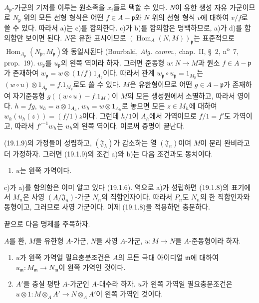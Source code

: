 
$A_{\mathfrak p}$-가군의 기저를 이루는 원소족을 $x_i$들로 택할 수
있다. $N$이 유한 생성 자유 가군이므로 $N_{\mathfrak p}$ 위의 모든
선형 형식은 어떤 $f\in A-\mathfrak p$와 $N$ 위의 선형 형식 $v$에
대하여 $v/f$로 쓸 수 있다. 따라서 a)는 c)를 함의한다. c)가 b)를
함의함은 명백하므로, a)가 d)를 함의함만 보이면 된다. $N$은 유한
표시이므로
$(\operatorname{Hom}_A(N,M))_{\mathfrak p}$는 표준적으로
$\operatorname{Hom}_{A_{\mathfrak p}}
(N_{\mathfrak p},M_{\mathfrak p})$와 동일시된다
(Bourbaki, \emph{Alg. comm.}, chap.~II, §~2,
n\textsuperscript{o}~7, prop.~19). $w_{\mathfrak p}$를
$u_{\mathfrak p}$의 왼쪽 역이라 하자. 그러면 준동형 $w:N\to M$과
원소 $f\in A-\mathfrak p$가 존재하여
$w_{\mathfrak p}=w\otimes(1/f)1_{A_{\mathfrak p}}$이다. 따라서 관계
$w_{\mathfrak p}\circ u_{\mathfrak p}=1_{M_{\mathfrak p}}$는
$(w\circ u)\otimes1_{A_{\mathfrak p}}
=f.1_{M_{\mathfrak p}}$로도 쓸 수 있다. $M$은 유한형이므로 어떤
$g\in A-\mathfrak p$가 존재하여 자기준동형
$g((w\circ u)-f.1_M)$이 $M$의 모든 생성원에서 소멸하고, 따라서
영이다. $h=fg$, $u_h=u\otimes1_{A_h}$,
$w_h=w\otimes1_{A_h}$로 놓으면 모든 $z\in M_h$에 대하여
$w_h(u_h(z))=(f/1)z$이다. 그런데 $h/1$이 $A_h$에서 가역이므로
$f/1=f'$도 가역이고, 따라서 $f'^{-1}w_h$는 $u_h$의 왼쪽 역이다.
이로써 증명이 끝난다.

\begin{proposition}[19.1.13]
\label{0.19.1.13-fr}
(19.1.9)의 가정들이 성립하고, $(\mathfrak J_\lambda)$가 감소하는 열
$(\mathfrak J_n)$이며 $M$이 분리 완비라고 더 가정하자. 그러면
(19.1.9)의 조건 a)와 b)는 다음 조건과도 동치이다.
\begin{enumerate}
  \item[c)] $u$는 왼쪽 가역이다.
\end{enumerate}
\end{proposition}

c)가 a)를 함의함은 이미 알고 있다 (19.1.6). 역으로 a)가 성립하면
(19.1.8)의 표기에서 $M_n$은 사영 $(A/\mathfrak J_n)$-가군
$N_n$의 직합인자이다. 따라서 $P_n$도 $N_n$의 한 직합인자와
동형이고, 그러므로 사영 가군이다. 이제 (19.1.8)을 적용하면
충분하다.

끝으로 다음 명제를 주목하자.

\begin{proposition}[19.1.14]
\label{0.19.1.14-fr}
$A$를 환, $M$을 유한형 $A$-가군, $N$을 사영 $A$-가군,
$u:M\to N$을 $A$-준동형이라 하자.
\begin{enumerate}
  \item[(i)] $u$가 왼쪽 가역일 필요충분조건은 $A$의 모든 극대
  아이디얼 $\mathfrak m$에 대하여
  $u_{\mathfrak m}:M_{\mathfrak m}\to N_{\mathfrak m}$이 왼쪽
  가역인 것이다.
  \item[(ii)] $A'$을 충실 평탄 $A$-가군인 $A$-대수라 하자. $u$가
  왼쪽 가역일 필요충분조건은
  $u\otimes1:M\otimes_AA'\to N\otimes_AA'$이 왼쪽 가역인 것이다.
\end{enumerate}
\end{proposition}

